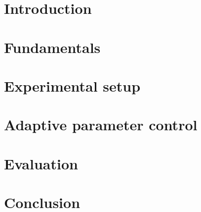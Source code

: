 \section{Introduction}



\section{Fundamentals}



\section{Experimental setup}



\section{Adaptive parameter control}



\section{Evaluation}



\section{Conclusion}

